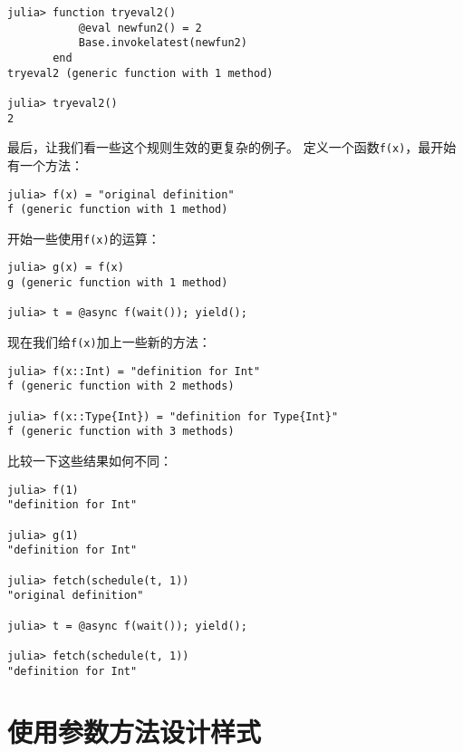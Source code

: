 \begin{verbatim}
julia> function tryeval2()
           @eval newfun2() = 2
           Base.invokelatest(newfun2)
       end
tryeval2 (generic function with 1 method)

julia> tryeval2()
2
\end{verbatim}



最后，让我们看一些这个规则生效的更复杂的例子。 定义一个函数\texttt{f(x)}，最开始有一个方法：




\begin{verbatim}
julia> f(x) = "original definition"
f (generic function with 1 method)
\end{verbatim}



开始一些使用\texttt{f(x)}的运算：




\begin{verbatim}
julia> g(x) = f(x)
g (generic function with 1 method)

julia> t = @async f(wait()); yield();
\end{verbatim}



现在我们给\texttt{f(x)}加上一些新的方法：




\begin{verbatim}
julia> f(x::Int) = "definition for Int"
f (generic function with 2 methods)

julia> f(x::Type{Int}) = "definition for Type{Int}"
f (generic function with 3 methods)
\end{verbatim}



比较一下这些结果如何不同：




\begin{verbatim}
julia> f(1)
"definition for Int"

julia> g(1)
"definition for Int"

julia> fetch(schedule(t, 1))
"original definition"

julia> t = @async f(wait()); yield();

julia> fetch(schedule(t, 1))
"definition for Int"
\end{verbatim}



\hypertarget{1696520674414442593}{}


\section{使用参数方法设计样式}



